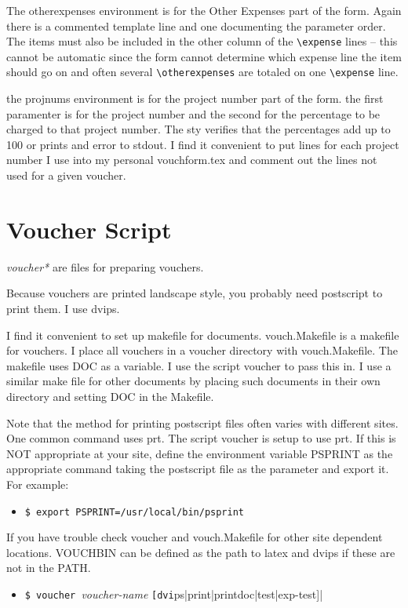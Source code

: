 The otherexpenses environment is for the Other Expenses part of the
form.  Again there is a commented template line and one documenting
the parameter order.  The items must also be included in the other
column of the \verb|\expense| lines -- this cannot be automatic since the
form cannot determine which expense line the item should go on and
often several \verb|\otherexpenses| are totaled on one \verb|\expense| line.  

the projnums environment is for the project number part of the form.
the first paramenter is for the project number and the second for the
percentage to be charged to that project number.  The sty verifies
that the percentages add up to 100 or prints and error to stdout.  I
find it convenient to put lines for each project number I use into my
personal vouchform.tex and comment out the lines not used for a given
voucher.  

\section{Voucher Script}

{\it voucher*} are files for preparing vouchers.  

Because vouchers are printed landscape style, you probably need
postscript to print them.  I use dvips.  

I find it convenient to set up makefile for documents.  vouch.Makefile
is a makefile for vouchers.  I place all vouchers in a voucher
directory with vouch.Makefile.  The makefile uses DOC as a variable.
I use the script voucher to pass this in.  I use a similar make file
for other documents by placing such documents in their own directory
and setting DOC in the Makefile.

Note that the method for printing postscript files often varies with
different sites.  One common command uses prt.  The script voucher is
setup to use prt.  If this is NOT appropriate at your site, define the
environment variable PSPRINT as the appropriate command taking the
postscript file as the parameter and export it.  For example:
\begin{itemize}
  \item[]
        \verb|$ export PSPRINT=/usr/local/bin/psprint|
\end{itemize}

If you have trouble check voucher and vouch.Makefile for other site
dependent locations.  VOUCHBIN can be defined as the path to latex and
dvips if these are not in the PATH.
\begin{itemize}
  \item[]
        \verb|$ voucher |{\it voucher-name} \verb|[dvi|ps|print|printdoc|test|exp-test]|
\end{itemize}

